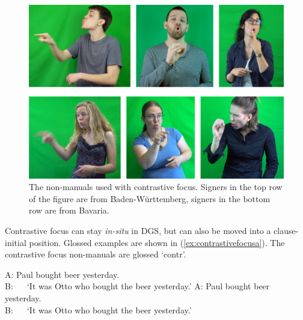 \begin{figure}[bt]
\centering
	\includegraphics[width=1.0\textwidth]{contrastivefocus2.jpg}
	\caption{The non-manuals used with contrastive focus. Signers in the top row of the figure are from Baden-Württemberg, signers in the bottom row are from Bavaria.}
	\label{contrastivefocus}
\end{figure}

Contrastive focus can stay \textit{in-situ} in DGS, but can also be moved into a clause-initial position. Glossed examples are shown in (\ref{ex:contrastivefocusa}). The contrastive focus non-manuals are glossed `contr'.

\begin{exe}
\ex\label{ex:contrastivefocusa}\begin{xlist}
\ex
A: Paul bought beer yesterday. \\
B:   
%
\glt \textcolor{white}{B: }`It was Otto who bought the beer yesterday.' \label{ex:contrastivefocusaa}
\ex
A: Paul bought beer yesterday. \\
B:  
%
\glt \textcolor{white}{B: }`It was Otto who bought the beer yesterday.' \label{ex:contrastivefocusab}


\end{xlist}
\end{exe}

